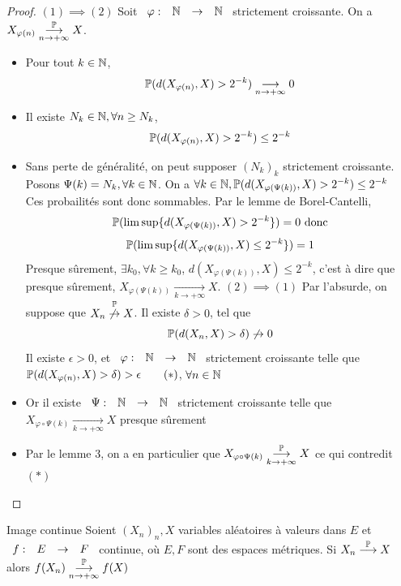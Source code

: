 \documentclass[]{report}
\begin{document}
    \begin{proof}
        $(1)\implies (2)$ Soit $\begin{array}{ccccc} \varphi : & \mathbb{N} & \to & \mathbb{N} \end{array}$ strictement croissante. On a $X_{\varphi(n)}\overunderset{\Pa}{n\to +\infty}{\longrightarrow}X$.\\
        \begin{itemize}
        \item Pour tout $k\in \mathbb{N}$,
        \[\mathbb{P}(d(X_{\varphi(n)},X)>2^{-k})\underset{n\to +\infty}{\longrightarrow}0\]
        \item Il existe $N_k\in \mathbb{N}, \forall n\ge N_k$,
        \[\mathbb{P}(d(X_{\varphi(n)},X)>2^{-k})\le 2^{-k}\]
        \item Sans perte de généralité, on peut supposer $(N_k)_k$ strictement croissante.\\
        Posons $\Psi(k)=N_k,\forall k\in \mathbb{N}$. On a $\forall k\in \mathbb{N},\mathbb{P}(d(X_{\varphi(\Psi(k))},X)>2^{-k})\le 2^{-k}$\\
        Ces probailités sont donc sommables. Par le lemme de Borel-Cantelli,
        \[\mathbb{P}(\limsup \{d(X_{\varphi(\Psi(k))},X)>2^{-k}\})=0\text{ donc}\]
        \[\mathbb{P}(\limsup \{d(X_{\varphi(\Psi(k))},X)\le 2^{-k}\})=1\]
        Presque sûrement, $\exists k_0,\forall k\ge k_0$, $d(X_{\varphi(\Psi(k))},X)\le 2^{-k}$, c'est à dire que presque sûrement, $X_{\varphi(\Psi(k))}\underset{k\to +\infty}{\longrightarrow}X$.
        $(2)\implies (1)$ Par l'absurde, on suppose que $X_n\overset{\mathbb{P}}{\not\to}X$. Il existe $\delta >0$, tel que
        \[\mathbb{P}(d(X_n,X)>\delta)\not\to 0\]
        Il existe $\epsilon>0$, et $\begin{array}{ccccc} \varphi : & \mathbb{N} & \to & \mathbb{N} \end{array}$ strictement croissante telle que $\mathbb{P}(d(X_{\varphi(n)},X)>\delta)>\epsilon\qquad (*)$, $\forall n\in \mathbb{N}$
        \item Or il existe $\begin{array}{ccccc} \Psi : & \mathbb{N} & \to & \mathbb{N} \end{array}$ strictement croissante telle que $X_{\varphi\circ \Psi(k)}\underset{k\to +\infty}{\longrightarrow}X$ presque sûrement
        \item Par le lemme 3, on a en particulier que $X_{\varphi\circ \Psi(k)}\overunderset{\Pa}{k\to +\infty}{\longrightarrow}X$ ce qui contredit $(*)$
        \end{itemize}
    \end{proof}

    \begin{cor}{Image continue}{}
        Soient $(X_n)_n,X$ variables aléatoires à valeurs dans $E$ et $\begin{array}{ccccc} f : & E & \to & F \end{array}$ continue, où $E,F$ sont des espaces métriques. Si $X_n\overset{\mathbb{P}}{\longrightarrow}X$ alors $f(X_n)\overunderset{\Pa}{n\to +\infty}{\longrightarrow}f(X)$
    \end{cor}
\end{document}
